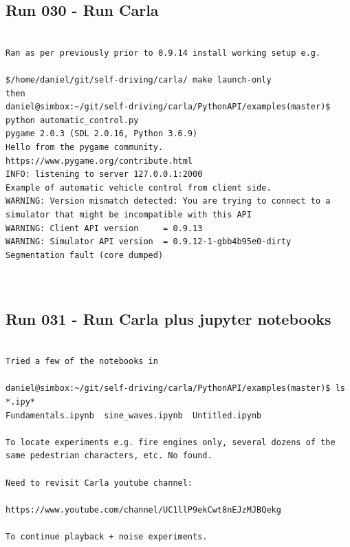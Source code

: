 \subsection{Run 030 - Run Carla }
\label{app_res:030}
\begin{verbatim}

Ran as per previously prior to 0.9.14 install working setup e.g.

$/home/daniel/git/self-driving/carla/ make launch-only
then
daniel@simbox:~/git/self-driving/carla/PythonAPI/examples(master)$ python automatic_control.py 
pygame 2.0.3 (SDL 2.0.16, Python 3.6.9)
Hello from the pygame community. https://www.pygame.org/contribute.html
INFO: listening to server 127.0.0.1:2000
Example of automatic vehicle control from client side.
WARNING: Version mismatch detected: You are trying to connect to a simulator that might be incompatible with this API 
WARNING: Client API version     = 0.9.13 
WARNING: Simulator API version  = 0.9.12-1-gbb4b95e0-dirty 
Segmentation fault (core dumped)



\end{verbatim}


\subsection{Run 031 - Run Carla plus jupyter notebooks }
\label{app_res:031}
\begin{verbatim}

Tried a few of the notebooks in 

daniel@simbox:~/git/self-driving/carla/PythonAPI/examples(master)$ ls *.ipy*
Fundamentals.ipynb  sine_waves.ipynb  Untitled.ipynb

To locate experiments e.g. fire engines only, several dozens of the same pedestrian characters, etc. No found.

Need to revisit Carla youtube channel:

https://www.youtube.com/channel/UC1llP9ekCwt8nEJzMJBQekg

To continue playback + noise experiments.



\end{verbatim}

